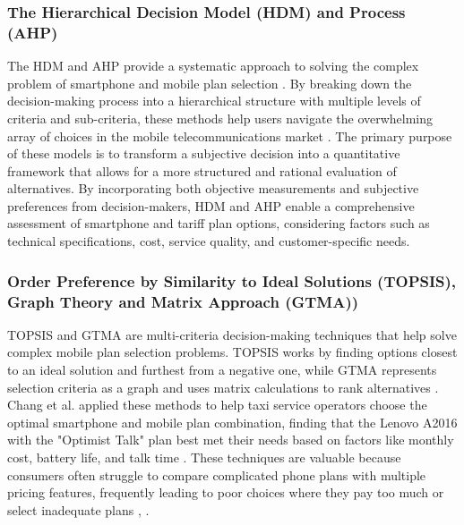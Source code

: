 \documentclass[conference]{IEEEtran}
\begin{document}
\subsubsection{The Hierarchical Decision Model (HDM) and Process (AHP)}
The HDM and AHP provide a systematic approach to solving the complex problem of smartphone and mobile plan selection \cite{b4}. By breaking down the decision-making process into a hierarchical structure with multiple levels of criteria and sub-criteria, these methods help users navigate the overwhelming array of choices in the mobile telecommunications market \cite{b5}. The primary purpose of these models is to transform a subjective decision into a quantitative framework that allows for a more structured and rational evaluation of alternatives. By incorporating both objective measurements and subjective preferences from decision-makers, HDM and AHP enable a comprehensive assessment of smartphone and tariff plan options, considering factors such as technical specifications, cost, service quality, and customer-specific needs.
\subsubsection{Order Preference by Similarity to Ideal Solutions (TOPSIS), Graph Theory and Matrix Approach (GTMA))}
TOPSIS and GTMA are multi-criteria decision-making techniques that help solve complex mobile plan selection problems. TOPSIS works by finding options closest to an ideal solution and furthest from a negative one, while GTMA represents selection criteria as a graph and uses matrix calculations to rank alternatives \cite{b4}. Chang et al. applied these methods to help taxi service operators choose the optimal smartphone and mobile plan combination, finding that the Lenovo A2016 with the "Optimist Talk" plan best met their needs based on factors like monthly cost, battery life, and talk time \cite{b4}. These techniques are valuable because consumers often struggle to compare complicated phone plans with multiple pricing features, frequently leading to poor choices where they pay too much or select inadequate plans \cite{b1}, \cite{b3}.
\end{document}
